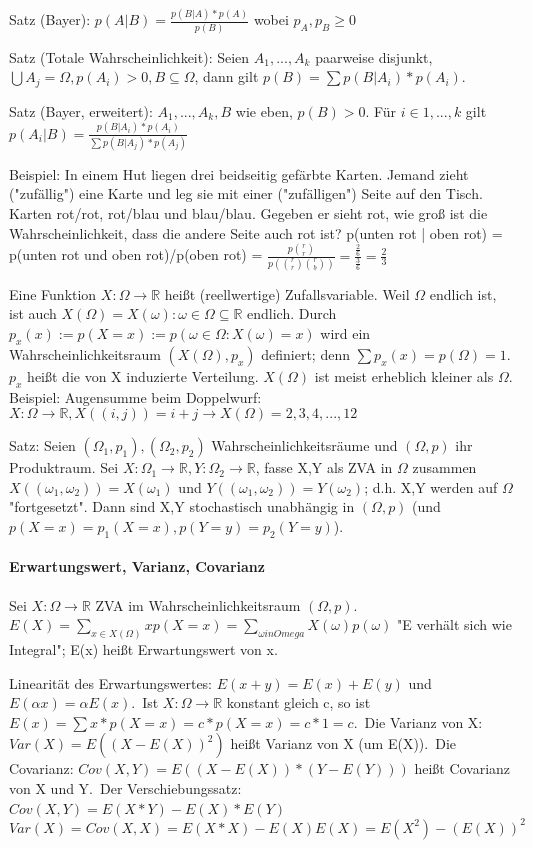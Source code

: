 \documentclass[10pt,landscape]{article}
\begin{document}
\begin{multicols}{3}
Satz (Bayer): $p(A|B)=\frac{p(B|A)*p(A)}{p(B)}$ wobei $p_A, p_B \geq 0$

Satz (Totale Wahrscheinlichkeit): Seien $A_1, ...,A_k$ paarweise disjunkt, $\bigcup A_j=\Omega, p(A_i)>0, B\subseteq \Omega$, dann gilt $p(B)=\sum p(B|A_i)*p(A_i)$.

Satz (Bayer, erweitert): $A_1,...,A_k,B$ wie eben, $p(B)>0$. Für $i\in {1,...,k}$ gilt $p(A_i|B)=\frac{p(B|A_i)*p(A_i)}{\sum p(B|A_j)*p(A_j)}$

Beispiel: In einem Hut liegen drei beidseitig gefärbte Karten. Jemand zieht ("zufällig") eine Karte und leg sie mit einer ("zufälligen") Seite auf den Tisch. Karten rot/rot, rot/blau und blau/blau. Gegeben er sieht rot, wie groß ist die Wahrscheinlichkeit, dass die andere Seite auch rot ist?
p(unten rot | oben rot) = p(unten rot und oben rot)/p(oben rot) = $\frac{p\binom{r}{r}}{p(\binom{r}{r}\binom{r}{b})}=\frac{\frac{2}{6}}{\frac{3}{6}}=\frac{2}{3}$

Eine Funktion $X:\Omega \rightarrow \mathbb{R}$ heißt (reellwertige) Zufallsvariable. Weil $\Omega$ endlich ist, ist auch $X(\Omega)={X(\omega): \omega \in \Omega}\subseteq \mathbb{R}$ endlich. Durch $p_x(x):=p(X=x):=p({\omega \in \Omega: X(\omega)=x})$ wird ein Wahrscheinlichkeitsraum $(X(\Omega),p_x)$ definiert; denn $\sum p_x(x)=p(\Omega)=1$. $p_x$ heißt die von X induzierte Verteilung. $X(\Omega)$ ist meist erheblich kleiner als $\Omega$.
Beispiel: Augensumme beim Doppelwurf: $X:\Omega\rightarrow \mathbb{R}, X((i,j))=i+j \rightarrow X(\Omega)={2,3,4,...,12}$

Satz: Seien $(\Omega_1, p_1),(\Omega_2, p_2)$ Wahrscheinlichkeitsräume und $(\Omega, p)$ ihr Produktraum. Sei $X:\Omega_1\rightarrow\mathbb{R},Y:\Omega_2\rightarrow \mathbb{R}$, fasse X,Y als ZVA in $\Omega$ zusammen $X((\omega_1,\omega_2))=X(\omega_1)$ und $Y((\omega_1,\omega_2))=Y(\omega_2)$; d.h. X,Y werden auf $\Omega$ "fortgesetzt". Dann sind X,Y stochastisch unabhängig in $(\Omega, p)$ (und $p(X=x)=p_1(X=x), p(Y=y)=p_2(Y=y)$).

\paragraph{Erwartungswert, Varianz, Covarianz}
Sei $X:\Omega\rightarrow \mathbb{R}$ ZVA im Wahrscheinlichkeitsraum $(\Omega, p)$. $E(X)=\sum_{x\in X(\Omega)}x p(X=x)=\sum_{\omega in Omega} X(\omega)p(\omega)$ "E verhält sich wie Integral"; E(x) heißt Erwartungswert von x.

Linearität des Erwartungswertes: $E(x+y)=E(x)+E(y)$ und $E(\alpha x)=\alpha E(x)$.\
Ist $X:\Omega\rightarrow \mathbb{R}$ konstant gleich c, so ist $E(x)=\sum x*p(X=x)=c*p(X=x)=c*1=c$.\
Die Varianz von X: $Var(X)=E((X-E(X))^2)$ heißt Varianz von X (um E(X)).\
Die Covarianz: $Cov(X,Y)=E((X-E(X))*(Y-E(Y)))$ heißt Covarianz von X und Y.\
Der Verschiebungssatz: $Cov(X,Y)=E(X*Y)-E(X)*E(Y)$\
$Var(X)=Cov(X,X)=E(X*X)-E(X)E(X)=E(X^2)-(E(X))^2$


\end{multicols}
\end{document}
